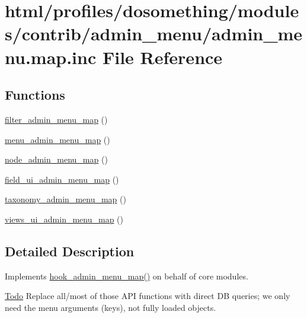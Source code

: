\hypertarget{admin__menu_8map_8inc}{
\section{html/profiles/dosomething/modules/contrib/admin\_\-menu/admin\_\-menu.map.inc File Reference}
\label{admin__menu_8map_8inc}
}
\subsection*{Functions}
\begin{DoxyCompactItemize}
\item 
\hyperlink{admin__menu_8map_8inc_ad1c4e40dd26113df9b8ae87691ada8ae}{filter\_\-admin\_\-menu\_\-map} ()
\item 
\hyperlink{admin__menu_8map_8inc_afb91fc5bbb65b06defebf57feae92cd7}{menu\_\-admin\_\-menu\_\-map} ()
\item 
\hyperlink{admin__menu_8map_8inc_a645da462c9f34a48bdfc0d76c47c1d8d}{node\_\-admin\_\-menu\_\-map} ()
\item 
\hyperlink{admin__menu_8map_8inc_a4641b75b26fd20d33c541e0b50b7cca9}{field\_\-ui\_\-admin\_\-menu\_\-map} ()
\item 
\hyperlink{admin__menu_8map_8inc_a9cf1f3384b4db256d5c656285569e9fa}{taxonomy\_\-admin\_\-menu\_\-map} ()
\item 
\hyperlink{admin__menu_8map_8inc_a163fdee910cbe6b7d402a19850eb12c2}{views\_\-ui\_\-admin\_\-menu\_\-map} ()
\end{DoxyCompactItemize}


\subsection{Detailed Description}
Implements \hyperlink{admin__menu_8api_8php_a4b3f2235db483f670a2e7327633868df}{hook\_\-admin\_\-menu\_\-map()} on behalf of core modules.

\begin{Desc}
\item[\hyperlink{todo__todo000001}{Todo}]Replace all/most of those API functions with direct DB queries; we only need the menu arguments (keys), not fully loaded objects. \end{Desc}


